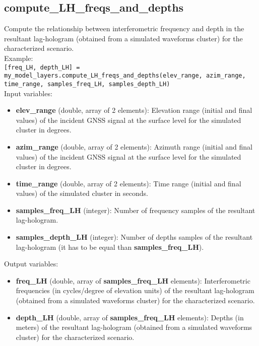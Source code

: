 \subsection{compute\_LH\_freqs\_and\_depths}

Compute the relationship between interferometric frequency and depth in the resultant lag-hologram (obtained from a simulated waveforms cluster) for the characterized scenario.\\

Example:\\

\texttt{[freq\_LH, depth\_LH] = my\_model\_layers.compute\_LH\_freqs\_and\_depths(elev\_range, azim\_range, time\_range, samples\_freq\_LH, samples\_depth\_LH)}\\

Input variables:
\begin{itemize}
\item {\bf elev\_range} (double, array of 2 elements): Elevation range (initial and final values) of the incident GNSS signal at the surface level for the simulated cluster in degrees.
\item {\bf azim\_range} (double, array of 2 elements): Azimuth range (initial and final values) of the incident GNSS signal at the surface level for the simulated cluster in degrees.
\item {\bf time\_range} (double, array of 2 elements): Time range (initial and final values) of the simulated cluster in seconds.
\item {\bf samples\_freq\_LH} (integer): Number of frequency samples of the resultant lag-hologram.
\item {\bf samples\_depth\_LH} (integer): Number of depths samples of the resultant lag-hologram (it has to be equal than {\bf samples\_freq\_LH}).
\end{itemize}

Output variables:
\begin{itemize}
\item {\bf freq\_LH} (double, array of {\bf samples\_freq\_LH} elements): Interferometric frequencies (in cycles/degree of elevation units) of the resultant lag-hologram (obtained from a simulated waveforms cluster) for the characterized scenario.
\item {\bf depth\_LH} (double, array of {\bf samples\_freq\_LH} elements): Depths (in meters) of the resultant lag-hologram (obtained from a simulated waveforms cluster) for the characterized scenario.
\end{itemize}


